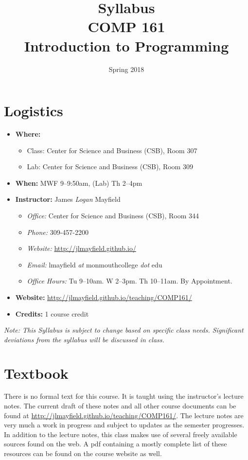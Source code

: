 \documentclass[10pt]{article}
\title{Syllabus \\ COMP 161 \\ Introduction to Programming}
\author{  }
\date{Spring 2018}
\begin{document}
\maketitle

\section{Logistics}
\begin{itemize}
\item \textbf{Where: }
\begin{itemize}
\item Class: Center for Science and Business (CSB), Room 307
\item Lab: Center for Science and Business (CSB), Room 309
\end{itemize}
\item \textbf{When: } MWF 9--9:50am, (Lab) Th 2--4pm
\item \textbf{Instructor: } James \textit{Logan} Mayfield
\begin{itemize}
\item \textit{Office: } Center for Science and Business (CSB), Room 344
\item \textit{Phone: } 309-457-2200 %
\item \textit{Website: } \url{http://jlmayfield.github.io/}
\item \textit{Email: } lmayfield \textit{at} monmouthcollege \textit{dot} edu
\item \textit{Office Hours: }  Tu 9--10am. W 2--3pm. Th 10--11am. By Appointment.
\end{itemize}
\item \textbf{Website: } \url{http://jlmayfield.github.io/teaching/COMP161/}
\item \textbf{Credits: } 1 course credit
\end{itemize}
\emph{Note: This Syllabus is subject to change based on specific class needs. Significant deviations from the syllabus will be discussed in class.}

\section{Textbook}

There is no formal text for this course. It is taught using the instructor's lecture notes. The current draft of these notes and all other course documents can be found at \url{http://jlmayfield.github.io/teaching/COMP161/}. The lecture notes are very much a work in progress and subject to updates as the semester progresses. In addition to the lecture notes, this class makes use of several freely available sources found on the web. A pdf containing a mostly complete list of these resources can be found on the course website as well.
\end{document}
